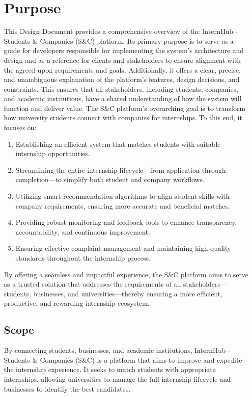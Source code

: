 \section{Purpose}
\label{sec:purpose}%
This Design Document provides a comprehensive overview of the InternHub - Students \& Companies (S\&C) platform. Its primary purpose is to serve as a guide for developers responsible for implementing the system’s architecture and design and as a reference for clients and stakeholders to ensure alignment with the agreed-upon requirements and goals.
Additionally, it offers a clear, precise, and unambiguous explanation of the platform’s features, design decisions, and constraints. This ensures that all stakeholders, including students, companies, and academic institutions, have a shared understanding of how the system will function and deliver value.
The S\&C platform’s overarching goal is to transform how university students connect with companies for internships. To this end, it focuses on:

\begin{enumerate}
    \item Establishing an efficient system that matches students with suitable internship opportunities.
    \item Streamlining the entire internship lifecycle—from application through completion—to simplify both student and company workflows. 
    \item Utilizing smart recommendation algorithms to align student skills with company requirements, ensuring more accurate and beneficial matches.
    \item Providing robust monitoring and feedback tools to enhance transparency, accountability, and continuous improvement.
    \item Ensuring effective complaint management and maintaining high-quality standards throughout the internship process.
\end{enumerate}

By offering a seamless and impactful experience, the S\&C platform aims to serve as a trusted solution that addresses the requirements of all stakeholders—students, businesses, and universities—thereby ensuring a more efficient, productive, and rewarding internship ecosystem.

\subsection{Scope}
\label{subsec:scope}%
\setcounter{g}{1}
\newcommand{\cg}{\theg\stepcounter{g}}
By connecting students, businesses, and academic institutions, InternHub - Students \& Companies (S&C) is a platform that aims to improve and expedite the internship experience. It seeks to match students with appropriate internships, allowing universities to manage the full internship lifecycle and businesses to identify the best candidates.

